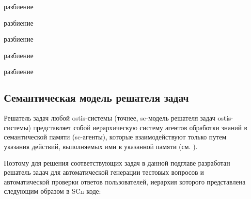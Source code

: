 \begin{scnrelfromset}{разбиение}
	
	
	\begin{scnrelfromset}{разбиение}
	\end{scnrelfromset}
	
	
	\begin{scnrelfromset}{разбиение}
	\end{scnrelfromset}
	
\end{scnrelfromset}

\begin{scnrelfromset}{разбиение}
\end{scnrelfromset}

\begin{scnrelfromset}{разбиение}
\end{scnrelfromset}


\subsection{Семантическая модель решателя задач}

Решатель задач любой ostis-системы (точнее, sc-модель решателя задач ostis-системы) представляет собой иерархическую систему агентов обработки знаний в семантической памяти (sc-агенты), которые взаимодействуют только путем указания действий, выполняемых ими в указанной памяти (см. ).

Поэтому для решения соответствующих задач в данной подглаве разработан решатель задач для автоматической генерации тестовых вопросов и автоматической проверки ответов пользователей, иерархия которого представлена следующим образом в SCn-коде:

